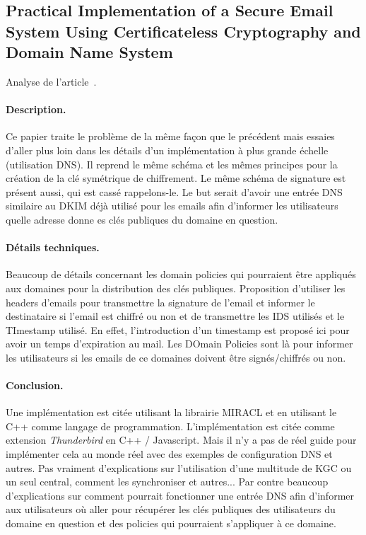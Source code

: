 \subsection{Practical Implementation of a Secure Email System Using Certificateless Cryptography and Domain Name System}
Analyse de l'article~\cite{DBLP:journals/ijnsec/BalakrishnanR16}.
\paragraph*{Description.} Ce papier traite le problème de la même façon que le précédent mais essaies d'aller plus loin dans les détails d'un implémentation à plus grande échelle (utilisation DNS). Il reprend le même schéma et les mêmes principes pour la création de la clé symétrique de chiffrement. Le même schéma de signature est présent aussi, qui est cassé rappelons-le. Le but serait d'avoir une entrée DNS similaire au DKIM déjà utilisé pour les emails afin d'informer les utilisateurs quelle adresse donne es clés publiques du domaine en question.
\paragraph*{Détails techniques.} Beaucoup de détails concernant les domain policies qui pourraient être appliqués aux domaines pour la distribution des clés publiques. Proposition d'utiliser les headers d'emails pour transmettre la signature de l'email et informer le destinataire si l'email est chiffré ou non et de transmettre les IDS utilisés et le TImestamp utilisé. En effet, l'introduction d'un timestamp est proposé ici pour avoir un temps d'expiration au mail. Les DOmain Policies sont là pour informer les utilisateurs si les emails de ce domaines doivent être signés/chiffrés ou non.
\paragraph*{Conclusion.} Une implémentation est citée utilisant la librairie MIRACL et en utilisant le C++ comme langage de programmation. L'implémentation est citée comme extension \textit{Thunderbird} en C++ / Javascript. Mais il n'y a pas de réel guide pour implémenter cela au monde réel avec des exemples de configuration DNS et autres. Pas vraiment d'explications sur l'utilisation d'une multitude de KGC ou un seul central, comment les synchroniser et autres... Par contre beaucoup d'explications sur comment pourrait fonctionner une entrée DNS afin d'informer aux utilisateurs où aller pour récupérer les clés publiques des utilisateurs du domaine en question et des policies qui pourraient s'appliquer à ce domaine.
